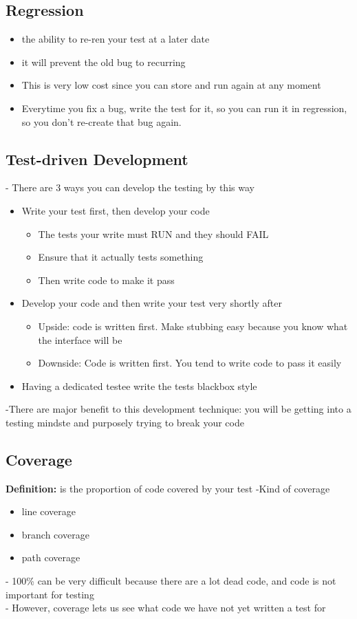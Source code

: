\documentclass{article}
\begin{document}
  \subsection{Regression}
  \begin{itemize}
    \item the ability to re-ren your test at a later date
    \item it will prevent the old bug to recurring
    \item This is very low cost since you can store and run again at any moment
    \item Everytime you fix a bug, write the test for it, so you can run it in
    regression, so you don't re-create that bug again.
  \end{itemize}
  
  \subsection{Test-driven Development}
  - There are  3 ways you can develop the testing by this way
  \begin{itemize}
    \item Write your test first, then develop your code
    \begin{itemize}
      \item The tests your write must RUN and they should FAIL
      \item Ensure that it actually tests something
      \item Then write code to make it pass
     \end{itemize}
    \item Develop your code and then write your test very shortly after
    \begin{itemize}
      \item Upside: code is written first. Make stubbing easy because you know
      what the interface will be
      \item Downside: Code is written first. You tend to write code to pass it
      easily
    \end{itemize}
    \item Having a dedicated testee write the tests blackbox style
  \end{itemize}
  -There are major benefit to this development technique: you will be getting
  into a testing mindste and purposely trying to break your code
  
  \subsection{Coverage}
   \textbf{Definition:} is the proportion of code covered by your test
   -Kind of coverage
   \begin{itemize}
     \item line coverage
     \item branch coverage
     \item path coverage
   \end{itemize}
   - 100\% can be very difficult because there are a lot dead code, and code is
   not important for testing\\
   - However, coverage lets us see what code we have not yet written a test
   for\\
\end{document}

